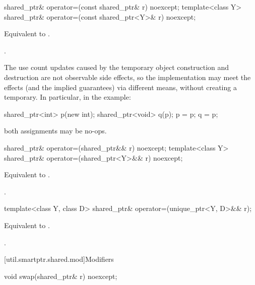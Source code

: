 %
\begin{itemdecl}
shared_ptr& operator=(const shared_ptr& r) noexcept;
template<class Y> shared_ptr& operator=(const shared_ptr<Y>& r) noexcept;
\end{itemdecl}

\begin{itemdescr}
\pnum
\effects
Equivalent to .

\pnum
\returns
{}.

\pnum
\begin{note}
The use count updates caused by the temporary object
construction and destruction are not observable side
effects, so the implementation may meet the effects (and the
implied guarantees) via different means, without creating a
temporary. In particular, in the example:
\begin{codeblock}
shared_ptr<int> p(new int);
shared_ptr<void> q(p);
p = p;
q = p;
\end{codeblock}
both assignments may be no-ops.
\end{note}
\end{itemdescr}

%
\begin{itemdecl}
shared_ptr& operator=(shared_ptr&& r) noexcept;
template<class Y> shared_ptr& operator=(shared_ptr<Y>&& r) noexcept;
\end{itemdecl}

\begin{itemdescr}
\pnum
\effects
Equivalent to .

\pnum
\returns
{}.
\end{itemdescr}

%
\begin{itemdecl}
template<class Y, class D> shared_ptr& operator=(unique_ptr<Y, D>&& r);
\end{itemdecl}

\begin{itemdescr}
\pnum
\effects
Equivalent to .

\pnum
\returns
{}.
\end{itemdescr}

[util.smartptr.shared.mod]{Modifiers}

%
\begin{itemdecl}
void swap(shared_ptr& r) noexcept;
\end{itemdecl}

